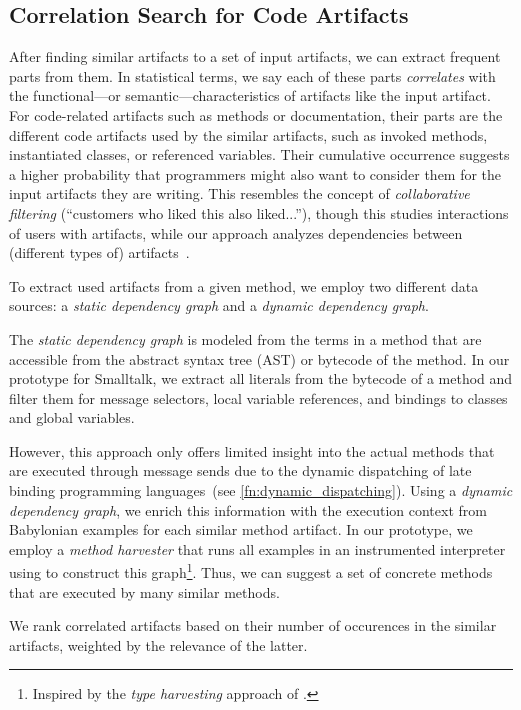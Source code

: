 \subsection*{Correlation Search for Code Artifacts}
\label{sec:suggestions/search/correlations}

After finding similar artifacts to a set of input artifacts, we can extract frequent parts from them.
In statistical terms, we say each of these parts \emph{correlates} with the functional---or semantic---characteristics of artifacts like the input artifact.
For code-related artifacts such as methods or documentation, their parts are the different code artifacts used by the similar artifacts, such as invoked methods, instantiated classes, or referenced variables.
Their cumulative occurrence suggests a higher probability that programmers might also want to consider them for the input artifacts they are writing.
This resembles the concept of \emph{collaborative filtering} (``customers who liked this also liked...''), though this studies interactions of users with artifacts, while our approach analyzes dependencies between (different types of) artifacts~\cite{su2009survey}.

To extract used artifacts from a given method, we employ two different data sources: a \emph{static dependency graph} and a \emph{dynamic dependency graph}.

The \emph{static dependency graph} is modeled from the terms in a method that are accessible from the abstract syntax tree (AST) or bytecode of the method.
In our prototype for Smalltalk, we extract all literals from the bytecode of a method and filter them for message selectors, local variable references, and bindings to classes and global variables.

However, this approach only offers limited insight into the actual methods that are executed through message sends due to the dynamic dispatching of late binding programming languages~(see \cref{fn:dynamic_dispatching}).
Using a \emph{dynamic dependency graph}, we enrich this information with the execution context from Babylonian examples for each similar method artifact.
In our prototype, we employ a \emph{method harvester} that runs all examples in an instrumented interpreter using  to construct this graph\footnote{Inspired by the \emph{type harvesting} approach of \cite{haupt2011type}.}.
Thus, we can suggest a set of concrete methods that are executed by many similar methods.

We rank correlated artifacts based on their number of occurences in the similar artifacts, weighted by the relevance of the latter.

